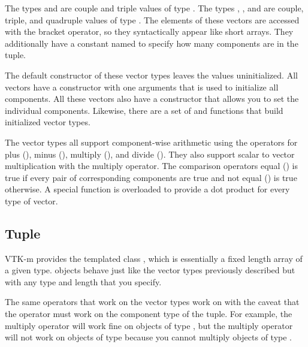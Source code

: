 The types  and  are couple and triple values of type
. The types , , and  are
couple, triple, and quadruple values of type . The elements of
these vectors are accessed with the bracket operator, so they syntactically
appear like short arrays. They additionally have a constant named
 to specify how many
components are in the tuple.

The default constructor of these vector types leaves the values
uninitialized. All vectors have a constructor with one arguments that is
used to initialize all components. All these vectors also have a
constructor that allows you to set the individual components. Likewise,
there are a set of  and  functions that
build initialized vector types. 


The vector types all support component-wise arithmetic using the operators
for plus (\textcode{+}), minus (\textcode{-}), multiply (\textcode{*}), and
divide (\textcode{/}). They also support scalar to vector multiplication
with the multiply operator. The comparison operators equal (\textcode{==})
is true if every pair of corresponding components are true and not equal
(\textcode{!=}) is true otherwise.  A special  function is
overloaded to provide a dot product for every type of vector.


\subsection{Tuple}

VTK-m provides the templated class , which is
essentially a fixed length array of a given type.  objects
behave just like the vector types previously described but with any type
and length that you specify.


The same operators that work on the vector types work on  with
the caveat that the operator must work on the component type of the
tuple. For example, the multiply operator will work fine on objects of type
, but the multiply operator will not work on objects
of type  because you cannot multiply
objects of type .

